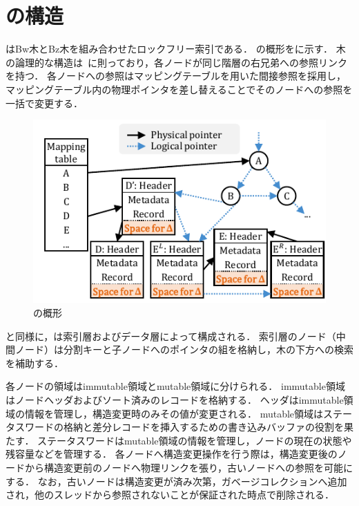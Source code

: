 \section{\Bctree{}の構造}
\label{sec:bc_tree_structure}

\Bctree{}はBw木とBz木を組み合わせたロックフリー索引である．
\Bctree{}の概形を\Fig{\ref{fig:bc_tree-structure}}に示す．
木の論理的な構造は\Blinktree{}~\cite{tods1981:Lehman}に則っており，各ノードが同じ階層の右兄弟への参照リンクを持つ．
各ノードへの参照はマッピングテーブルを用いた間接参照を採用し，マッピングテーブル内の物理ポインタを差し替えることでそのノードへの参照を一括で変更する．

\begin{figure}[t]
    \centering
    \includegraphics{./figures/Bc-structure.pdf}
    \caption{\Bctree{}の概形}
    \label{fig:bc_tree-structure}
\end{figure}

\Bptree{}と同様に，\Bctree{}は索引層およびデータ層によって構成される．
索引層のノード（中間ノード）は分割キーと子ノードへのポインタの組を格納し，木の下方への検索を補助する．

各ノードの領域はimmutable領域とmutable領域に分けられる．
immutable領域はノードヘッダおよびソート済みのレコードを格納する．
ヘッダはimmutable領域の情報を管理し，構造変更時のみその値が変更される．
mutable領域はステータスワードの格納と差分レコードを挿入するための書き込みバッファの役割を果たす．
ステータスワードはmutable領域の情報を管理し，ノードの現在の状態や残容量などを管理する．
各ノードへ構造変更操作を行う際は，構造変更後のノードから構造変更前のノードへ物理リンクを張り，古いノードへの参照を可能にする．
なお，古いノードは構造変更が済み次第，ガベージコレクションへ追加され，他のスレッドから参照されないことが保証された時点で削除される．

